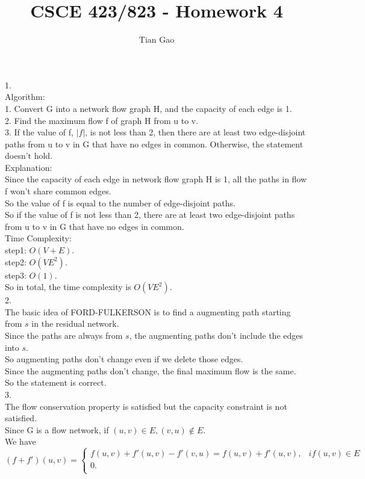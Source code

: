 \documentclass[a4paper]{article}
\title{CSCE 423/823 - Homework 4}
\author{Tian Gao}
\begin{document}
\maketitle

1.\\
Algorithm:\\
1. Convert G into a network flow graph H, and the capacity of each edge is 1.\\
2. Find the maximum flow f of graph H from u to v.\\
3. If the value of f, $|f|$, is not less than 2, then there are at least two edge-disjoint paths from u to v in G that have no edges in common. 
Otherwise, the statement doesn't hold.\\

Explanation:\\
Since the capacity of each edge in network flow graph H is 1, all the paths in flow f won't share common edges.\\
So the value of f is equal to the number of edge-disjoint paths.\\
So if the value of f is not less than 2, there are at least two edge-disjoint paths from u to v in G that have no edges in common.\\

Time Complexity:\\
step1: $O(V + E)$.\\
step2: $O(VE^2)$.\\
step3: $O(1)$.\\
So in total, the time complexity is $O(VE^2)$.\\

2.\\
The basic idea of FORD-FULKERSON is to find a augmenting path starting from $s$ in the residual network.\\
Since the paths are always from $s$, the augmenting paths don't include the edges into $s$.\\ 
So augmenting paths don't change even if we delete those edges.\\
Since the augmenting paths don't change, the final maximum flow is the same.\\
So the statement is correct.\\

3.\\
The flow conservation property is satisfied but the capacity constraint is not satisfied.\\
Since G is a flow network, if $(u,v) \in E, (v, u) \notin E$.\\
We have
\begin{equation}
	(f+f')(u,v)=\left\{
	\begin{array}{lr}
		f(u,v) + f'(u,v) - f'(v,u) = f(u,v) + f'(u,v), & if (u, v) \in E \\
		0.                                             &                 \\
	\end{array}
	\right.
\end{equation}
\end{document}
